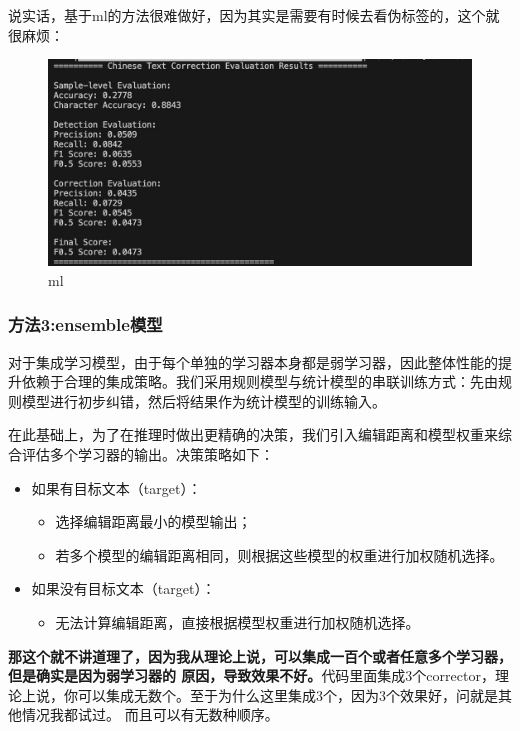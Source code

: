 \documentclass[answers]{exam}  %
\begin{document}
说实话，基于ml的方法很难做好，因为其实是需要有时候去看伪标签的，这个就很麻烦：

\begin{figure}[H]
    \centering
    \label{ml}
    \includegraphics[width=.6\textwidth]{../pic/ml.png} 
    \caption{ml}  
\end{figure}


\subsubsection{方法3:ensemble模型}

对于集成学习模型，由于每个单独的学习器本身都是弱学习器，因此整体性能的提升依赖于合理的集成策略。我们采用规则模型与统计模型的串联训练方式：先由规则模型进行初步纠错，然后将结果作为统计模型的训练输入。

在此基础上，为了在推理时做出更精确的决策，我们引入编辑距离和模型权重来综合评估多个学习器的输出。决策策略如下：

\begin{itemize}
    \item 如果有目标文本（target）：
    \begin{itemize}
        \item 选择编辑距离最小的模型输出；
        \item 若多个模型的编辑距离相同，则根据这些模型的权重进行加权随机选择。
    \end{itemize}

    \item 如果没有目标文本（target）：
    \begin{itemize}
        \item 无法计算编辑距离，直接根据模型权重进行加权随机选择。
    \end{itemize}
\end{itemize}

\textbf{那这个就不讲道理了，因为我从理论上说，可以集成一百个或者任意多个学习器，但是确实是因为弱学习器的
原因，导致效果不好。}代码里面集成3个corrector，理论上说，你可以集成无数个。至于为什么这里集成3个，因为3个效果好，问就是其他情况我都试过。
而且可以有无数种顺序。
\end{document}
